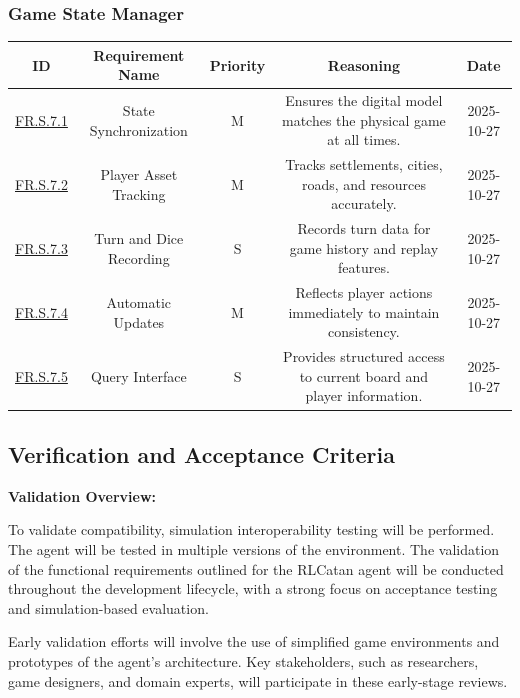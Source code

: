 \documentclass{article}
\begin{document}
\subsubsection*{Game State Manager}

\begin{tabular}{|c|c|c|c|c|}
\hline
\textbf{ID} & \textbf{Requirement Name} & \textbf{Priority} &
\textbf{Reasoning} & \textbf{Date} \\
\hline
\hyperref[FR.S.7.1]{FR.S.7.1} & State Synchronization & M &
\parbox[t]{4cm}{Ensures the digital model matches the physical game
at all times.} &
2025-10-27 \\
\hline
\hyperref[FR.S.7.2]{FR.S.7.2} & Player Asset Tracking & M &
\parbox[t]{4cm}{Tracks settlements, cities, roads, and resources
accurately.} &
2025-10-27 \\
\hline
\hyperref[FR.S.7.3]{FR.S.7.3} & Turn and Dice Recording & S &
\parbox[t]{4cm}{Records turn data for game history and replay
features.} &
2025-10-27 \\
\hline
\hyperref[FR.S.7.4]{FR.S.7.4} & Automatic Updates & M &
\parbox[t]{4cm}{Reflects player actions immediately to maintain
consistency.} &
2025-10-27 \\
\hline
\hyperref[FR.S.7.5]{FR.S.7.5} & Query Interface & S &
\parbox[t]{4cm}{Provides structured access to current board and
player information.} &
2025-10-27 \\
\hline
\end{tabular}

\vspace{1em}
\subsection{Verification and Acceptance Criteria}\label{subsec:verification-and-acceptance-criteria}

\noindent\textbf{Validation Overview:}

To validate compatibility, simulation interoperability testing will be performed. The \RL{} agent will be tested in multiple versions of the environment. The validation of the functional requirements outlined for the RLCatan agent will be conducted throughout the development lifecycle, with a strong focus on acceptance testing and simulation-based evaluation.

Early validation efforts will involve the use of simplified \emph{\Catan{}} game environments and prototypes of the \RL{} agent's architecture. Key stakeholders, such as \AI{} researchers, game designers, and domain experts, will participate in these early-stage reviews.
\end{document}

